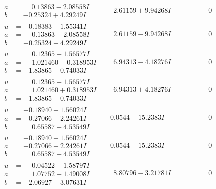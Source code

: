\documentclass[1p]{elsarticle_modified}
\theoremstyle{definition}
\begin{document}
$$\begin{array}{c|c|c}
\begin{aligned}
a &= \phantom{-}0.13863 - 2.08558 I \\
b &= -0.25324 + 4.29249 I\end{aligned}
 & \phantom{-}2.61159 + 9.94268 I & \phantom{-0.000000 } 0 \\ \hline\begin{aligned}
u &= -0.18383 - 1.55341 I \\
a &= \phantom{-}0.13863 + 2.08558 I \\
b &= -0.25324 - 4.29249 I\end{aligned}
 & \phantom{-}2.61159 - 9.94268 I & \phantom{-0.000000 } 0 \\ \hline\begin{aligned}
u &= \phantom{-}0.12365 + 1.56577 I \\
a &= \phantom{-}1.021460 - 0.318953 I \\
b &= -1.83865 + 0.74033 I\end{aligned}
 & \phantom{-}6.94313 - 4.18276 I & \phantom{-0.000000 } 0 \\ \hline\begin{aligned}
u &= \phantom{-}0.12365 - 1.56577 I \\
a &= \phantom{-}1.021460 + 0.318953 I \\
b &= -1.83865 - 0.74033 I\end{aligned}
 & \phantom{-}6.94313 + 4.18276 I & \phantom{-0.000000 } 0 \\ \hline\begin{aligned}
u &= -0.18940 + 1.56024 I \\
a &= -0.27066 + 2.24261 I \\
b &= \phantom{-}0.65587 - 4.53549 I\end{aligned}
 & -0.0544 + 15.2383 I & \phantom{-0.000000 } 0 \\ \hline\begin{aligned}
u &= -0.18940 - 1.56024 I \\
a &= -0.27066 - 2.24261 I \\
b &= \phantom{-}0.65587 + 4.53549 I\end{aligned}
 & -0.0544 - 15.2383 I & \phantom{-0.000000 } 0 \\ \hline\begin{aligned}
u &= \phantom{-}0.04522 + 1.58797 I \\
a &= \phantom{-}1.07752 + 1.49008 I \\
b &= -2.06927 - 3.07631 I\end{aligned}
 & \phantom{-}8.80796 - 3.21781 I & \phantom{-0.000000 } 0\\

\end{array}$$
\end{document}
